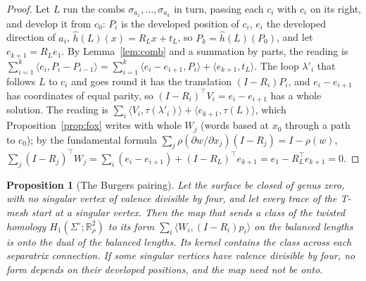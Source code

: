 \documentclass[11pt,a4paper]{article}
\newtheorem{proposition}{Proposition}
\newcommand{\R}{\mathbb{R}}
\newcommand{\lean}[1]{\texttt{\detokenize{#1}}}
\newenvironment{evidence}[3][]{}{}
\begin{document}
\begin{proof}
Let $L$ run the combs $\sigma_{a_1}, \dots, \sigma_{a_k}$ in turn, passing
each $c_i$ with $c_i$ on its right, and develop it from $c_0$: $P_i$ is the
developed position of $c_i$, $e_i$ the developed direction of $a_i$, $\hat
h(L)(x) = R_L x + t_L$, so $P_k = \hat h(L)(P_0)$, and let $e_{k+1} = R_L e_1$.
By Lemma~\ref{lem:comb} and a summation by parts, the reading is
$\sum_{i=1}^k \langle e_i, P_i - P_{i-1}\rangle = \sum_{i=1}^k \langle e_i -
e_{i+1}, P_i\rangle + \langle e_{k+1}, t_L\rangle$. The loop $\lambda'_i$ that
follows $L$ to $c_i$ and goes round it has the translation $(I - R_i)P_i$, and
$e_i - e_{i+1}$ has coordinates of equal parity, so $(I - R_i)^\top V_i = e_i
- e_{i+1}$ has a whole solution. The reading is $\sum_i \langle V_i,
\tau(\lambda'_i)\rangle + \langle e_{k+1}, \tau(L)\rangle$, which
Proposition~\ref{prop:fox} writes with whole $W_j$ (words based at $x_0$
through a path to $c_0$); by the fundamental formula $\sum_j \rho(\partial
w/\partial x_j)(I - R_j) = I - \rho(w)$, $\sum_j (I - R_j)^\top W_j = \sum_i
(e_i - e_{i+1}) + (I - R_L)^\top e_{k+1} = e_1 - R_L^\top e_{k+1} = 0$.
\end{proof}

\begin{evidence}{core}{\lean{Pairing.pairing_surjective}, \lean{Pairing.pairing_surjective_of_ne_one}, \lean{Pairing.form_update_of_eq_one}; tested: the 35 spheres without valence $4k$ of 50 random instances, rank equal to the dimension on every one; on tori the period term lets it fail (11 of 15); assumed: the presentation of $\pi_1(\Sigma^\circ)$ by the $\lambda_i$ and one relation of trivial holonomy, the developed positions $p_i$ linear in the lengths, every comb developed in the chart of the base point through loops $\lambda_i$; not formalized: the kernel, and that with a valence divisible by four the map need not be onto (only that no form depends on those positions)}
\begin{proposition}[The Burgers pairing]\label{prop:pairing}
Let the surface be closed of genus zero, with no singular vertex of valence
divisible by four, and let every trace of the T-mesh start at a singular
vertex. Then the map that sends a class of the twisted homology
$H_1(\Sigma^\circ; \R^2_\rho)$ to its form $\sum_i \langle W_i, (I - R_i)p_i
\rangle$ on the balanced lengths is onto the dual of the balanced lengths. Its
kernel contains the class across each separatrix connection. If some singular
vertices have valence divisible by four, no form depends on their developed
positions, and the map need not be onto.
\end{proposition}
\end{evidence}
\end{document}
